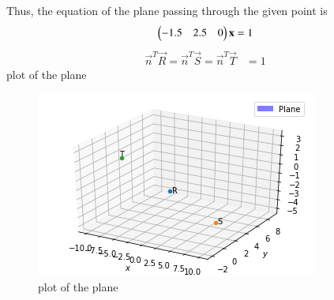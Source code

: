 \documentclass[journal,12pt,twocolumn]{IEEEtran}
\begin{document}
Thus, the equation of the plane passing through the given point is
%
\begin{align}
\begin{pmatrix}-1.5 & 2.5 & 0\end{pmatrix}\mathbf{x} = 1
\end{align} 
\begin{align}
\vec{n}^T\vec{R} = \vec{n}^T\vec{S} = \vec{n}^T\vec{T} &= 1
\end{align}
plot of the plane
\begin{figure}[ht]
\centering
\includegraphics[width=\columnwidth]{figure.png}
\caption{plot of the plane}
\label{Plot of the plane}
\end{figure}
\end{document}
